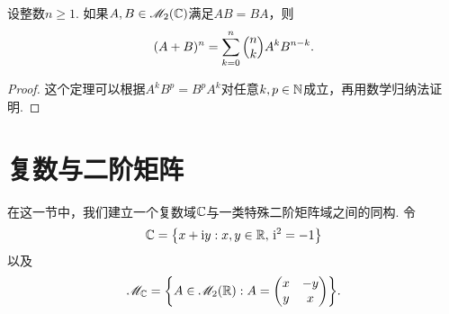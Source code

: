   \begin{mybox}
    \begin{theorem}[矩阵的二项式定理.]

      设整数$n\ge1$. 如果$A,B\in\mathscr M_2(\mathbb C)$满足$AB=BA$，则
      \[
        (A+B)^n = \sum_{k=0}^n\Binom nk A^kB^{n-k}.
      \]
    \end{theorem}
  \end{mybox}
  \begin{proof}
    这个定理可以根据$A^kB^p=B^pA^k$对任意$k,p\in\mathbb N$成立，再用数学归纳法证明.
  \end{proof}

\section{复数与二阶矩阵}
  在这一节中，我们建立一个复数域$\mathbb C$与一类特殊二阶矩阵域之间的同构. 令
  \[
    \mathbb C = \big\{ x+\mathrm i y:x,y\in\mathbb R,\,\mathrm i^2=-1 \big\}
  \]
  以及
  \[
    \MM_{\MC} = \left\{
      A\in\MM_2(\MR): A = \begin{pmatrix}
        x & -y \\
        y & x
      \end{pmatrix}
    \right\}.
  \]
